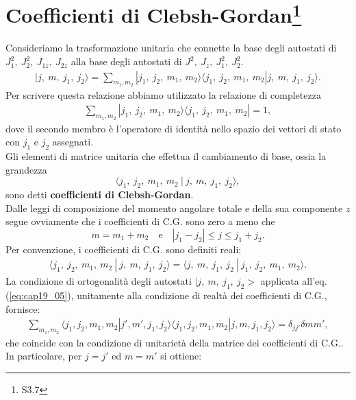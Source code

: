 \section[Coefficienti di Clebsh-Gordan]{Coefficienti di Clebsh-Gordan\footnote{S3.7}}
Consideriamo la trasformazione unitaria che connette la base degli autostati di $J_1^2 ,~ J_2^2 ,~ J_{1z} ,~ J_{2z}$ alla base degli autostati di  $J^2 ,~ J_z ,~ J_1^2 ,~ J_2^2$.
\begin{align} \label{eq:cap19_05}
| j ,~ m,~j_1, ~ j_2 \rangle  = \sum_{m_1, m_2} {| j_1 ,~ j_2,~m_1, ~ m_2 \rangle \langle j_1 ,~ j_2,~m_1, ~ m_2 |  j ,~ m,~j_1, ~ j_2 \rangle }.
\end{align}
Per scrivere questa relazione abbiamo utilizzato la relazione di completezza
\begin{align}
\sum_{m_1, m_2} {| j_1 ,~ j_2,~m_1, ~ m_2 \rangle \langle j_1 ,~ j_2,~m_1, ~ m_2 | = 1 },
\end{align}
dove il secondo membro è l'operatore di identità nello spazio dei vettori di stato con $j_1$ e $j_2$ assegnati. \\
Gli elementi di matrice unitaria che effettua il cambiamento di base, ossia la grandezza
\begin{equation}
\langle j_1 ,~ j_2,~m_1, ~ m_2 ~|~ j ,~ m,~j_1, ~ j_2 \rangle ,
\end{equation}
sono detti \textbf{coefficienti di Clebsh-Gordan}.\\
Dalle leggi di composizione del momento angolare totale e della sua componente $z$ segue ovviamente che i coefficienti di C.G. sono zero a meno che
\begin{equation}
m=m_1+m_2\quad \textrm{e}\quad |j_1-j_2| \leq j \leq j_1+j_2.
\end{equation}
Per convenzione, i coefficienti di C.G. sono definiti reali:
\begin{align}
\langle j_1 ,~ j_2,~m_1, ~ m_2~ |~ j ,~ m,~j_1, ~ j_2 \rangle  = \langle j ,~ m,~j_1, ~ j_2~ |~ j_1 ,~ j_2,~m_1, ~ m_2 \rangle .
\end{align}
La condizione di ortogonalità degli autostati $\mid j ,~ m,~j_1, ~ j_2 >$ applicata all'eq. (\ref{eq:cap19_05}), unitamente alla condizione di realtà dei coefficienti di C.G., fornisce:
\begin{align}
 \sum_{m_1, m_2} {\langle j_1 , j_2, m_1, m_2 | j' , m', j_1, j_2 \rangle  \langle j_1 , j_2, m_1, m_2  | j , m, j_1, j_2 \rangle } = \delta_{j j'} \delta{m m'},
\end{align}
che coincide con la condizione di unitarietà della matrice dei coefficienti di C.G.. In particolare, per $j=j'$ ed $m=m'$ si ottiene:
